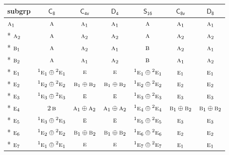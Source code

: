 \documentclass[10pt,a4paper]{article}
\numberwithin{equation}{section}
\newcommand{\grp}[1]{\mathsf{#1}}
\newcommand{\irr}[1]{\text{\normalfont\scshape #1}}
\newcommand{\conjpair}[1]{{}^{#1}}
\begin{document}
{\small\begin{longtable}{@{}lcccccc@{}}\toprule
subgrp & \href{C8.pdf}{$\grp{C_{8}}$} & \href{C4v.pdf}{$\grp{C_{4v}}$} & \href{D4.pdf}{$\grp{D_{4}}$} & \href{S16.pdf}{$\grp{S_{16}}$} & \href{C8v.pdf}{$\grp{C_{8v}}$} & \href{D8.pdf}{$\grp{D_{8}}$}\\\midrule\endhead
\bottomrule\endfoot\endlastfoot
$\irr{a}_{1}$ & $\irr{a}$ & $\irr{a}_{1}$ & $\irr{a}_{1}$ & $\irr{a}$ & $\irr{a}_{1}$ & $\irr{a}_{1}$\\*
$\irr{a}_{2}$ & $\irr{a}$ & $\irr{a}_{2}$ & $\irr{a}_{2}$ & $\irr{a}$ & $\irr{a}_{2}$ & $\irr{a}_{2}$\\*
$\irr{b}_{1}$ & $\irr{a}$ & $\irr{a}_{2}$ & $\irr{a}_{1}$ & $\irr{b}$ & $\irr{a}_{2}$ & $\irr{a}_{1}$\\*
$\irr{b}_{2}$ & $\irr{a}$ & $\irr{a}_{1}$ & $\irr{a}_{2}$ & $\irr{b}$ & $\irr{a}_{1}$ & $\irr{a}_{2}$\\*
$\irr{e}_{1}$ & $\conjpair{1}\irr{e}_{1}\oplus \conjpair{2}\irr{e}_{1}$ & $\irr{e}$ & $\irr{e}$ & $\conjpair{1}\irr{e}_{1}\oplus \conjpair{2}\irr{e}_{1}$ & $\irr{e}_{1}$ & $\irr{e}_{1}$\\*
$\irr{e}_{2}$ & $\conjpair{1}\irr{e}_{2}\oplus \conjpair{2}\irr{e}_{2}$ & $\irr{b}_{1}\oplus \irr{b}_{2}$ & $\irr{b}_{1}\oplus \irr{b}_{2}$ & $\conjpair{1}\irr{e}_{2}\oplus \conjpair{2}\irr{e}_{2}$ & $\irr{e}_{2}$ & $\irr{e}_{2}$\\*
$\irr{e}_{3}$ & $\conjpair{1}\irr{e}_{3}\oplus \conjpair{2}\irr{e}_{3}$ & $\irr{e}$ & $\irr{e}$ & $\conjpair{1}\irr{e}_{3}\oplus \conjpair{2}\irr{e}_{3}$ & $\irr{e}_{3}$ & $\irr{e}_{3}$\\*
$\irr{e}_{4}$ & $2\,\irr{b}$ & $\irr{a}_{1}\oplus \irr{a}_{2}$ & $\irr{a}_{1}\oplus \irr{a}_{2}$ & $\conjpair{1}\irr{e}_{4}\oplus \conjpair{2}\irr{e}_{4}$ & $\irr{b}_{1}\oplus \irr{b}_{2}$ & $\irr{b}_{1}\oplus \irr{b}_{2}$\\*
$\irr{e}_{5}$ & $\conjpair{1}\irr{e}_{3}\oplus \conjpair{2}\irr{e}_{3}$ & $\irr{e}$ & $\irr{e}$ & $\conjpair{1}\irr{e}_{5}\oplus \conjpair{2}\irr{e}_{5}$ & $\irr{e}_{3}$ & $\irr{e}_{3}$\\*
$\irr{e}_{6}$ & $\conjpair{1}\irr{e}_{2}\oplus \conjpair{2}\irr{e}_{2}$ & $\irr{b}_{1}\oplus \irr{b}_{2}$ & $\irr{b}_{1}\oplus \irr{b}_{2}$ & $\conjpair{1}\irr{e}_{6}\oplus \conjpair{2}\irr{e}_{6}$ & $\irr{e}_{2}$ & $\irr{e}_{2}$\\*
$\irr{e}_{7}$ & $\conjpair{1}\irr{e}_{1}\oplus \conjpair{2}\irr{e}_{1}$ & $\irr{e}$ & $\irr{e}$ & $\conjpair{1}\irr{e}_{7}\oplus \conjpair{2}\irr{e}_{7}$ & $\irr{e}_{1}$ & $\irr{e}_{1}$\\
\bottomrule\end{longtable}}
\end{document}
